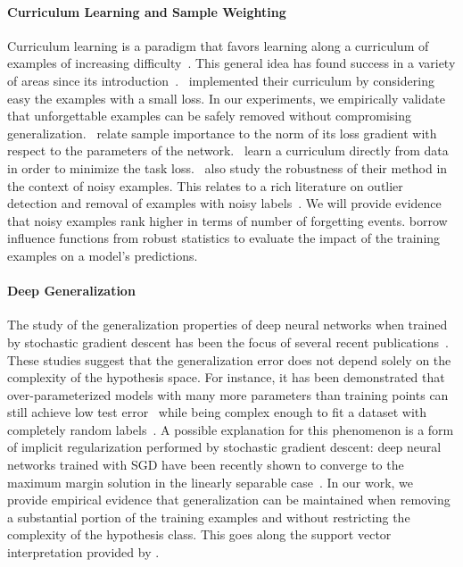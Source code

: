 
\paragraph{Curriculum Learning and Sample Weighting}
Curriculum learning is a paradigm that favors learning along a curriculum of examples of increasing difficulty~\citep{bengio2009curriculum}. This general idea has found success in a variety of areas since its introduction~\citep{Kumar10,lee2011learning,schaul2015prioritized}.~\citet{Kumar10} implemented their curriculum by considering easy the examples with a small loss. In our experiments, we empirically validate that unforgettable examples can be safely removed without compromising generalization.~\citet{Zhao2015,conf/icml/KatharopoulosF18} relate sample importance to the norm of its loss gradient with respect to the parameters of the network.~\citet{Fan2017,screenerNet,jiang18mentor} learn a curriculum directly from data in order to minimize the task loss.~\citet{jiang18mentor} also study the robustness of their method in the context of noisy examples. This relates to a rich literature on outlier detection and removal of examples with noisy labels~\citep{john1995robust,brodley1999identifying,sukhbaatar2014training,jiang18mentor}. We will provide evidence that noisy examples rank higher in terms of number of forgetting events. \cite{conf/icml/KohL17} borrow influence functions from robust statistics to evaluate the impact of the training examples on a model's predictions.

\paragraph{Deep Generalization} The study of the generalization properties of deep neural networks when trained by stochastic gradient descent has been the focus of several recent publications~\citep{zhang2016understanding, keskar2016large, Chaudhari2016,Advani2017HighdimensionalDO}. These studies suggest that the generalization error does not depend solely on the complexity of the hypothesis space. For instance, it has been demonstrated that over-parameterized models with many more parameters than training points can still achieve low test error~\citep{huang2017densely,Wang2018} while being complex enough to fit a dataset with completely random labels~\citep{zhang2016understanding}.
A possible explanation for this phenomenon is a form of implicit regularization performed by stochastic gradient descent: deep neural networks trained with SGD have been recently shown to converge to the maximum margin solution in the linearly separable case~\citep{Soudry2017,separable2}. In our work, we provide empirical evidence that generalization can be maintained when removing a substantial portion of the training examples and without restricting the complexity of the hypothesis class. This goes along the support vector interpretation provided by \citet{Soudry2017}.

